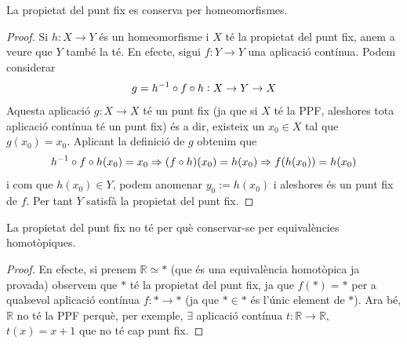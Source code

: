 \documentclass[../main.tex]{subfiles}
\begin{document}
\begin{prop}
[Exercici 11b]\label{exercici2.11.b} La propietat del punt fix es conserva per homeomorfismes.
\end{prop}
\begin{proof}
Si $h:X\rightarrow Y$ és un homeomorfisme i $X$ té la propietat del punt fix, anem a veure que $Y$ també la té. En efecte, sigui $f:Y\rightarrow Y$ una aplicació contínua. Podem considerar
\begin{equation}
    \notag
    g = h^{-1}\circ f\circ h:X\rightarrow Y\rightarrow X
\end{equation}
Aquesta aplicació $g:X\rightarrow X$ té un punt fix (ja que si $X$ té la PPF, aleshores tota aplicació contínua té un punt fix) és a dir, existeix un $x_0\in X$ tal que $g(x_0) = x_0$. Aplicant la definició de $g$ obtenim que
\begin{equation}
    \notag
    h^{-1}\circ f\circ h(x_0) = x_0 \Rightarrow (f\circ h)(x_0) = h(x_0) \Rightarrow f(h(x_0)) = h(x_0)
\end{equation}
i com que $h(x_0)\in Y$, podem anomenar $y_0:=h(x_0)$ i aleshores és un punt fix de $f$. Per tant $Y$ satisfà la propietat del punt fix.
\end{proof}

\begin{nota}
[Exercici 11b]\label{exercici2.11.b.2} La propietat del punt fix no té per què conservar-se per equivalències homotòpiques.
\end{nota}
\begin{proof}
En efecte, si prenem $\mathbb{R}\simeq *$ (que és una equivalència homotòpica ja provada) observem que $*$ té la propietat del punt fix, ja que $f(*) = *$ per a qualsevol aplicació contínua $f:*\rightarrow *$ (ja que $*\in *$ és l'únic element de $*$). Ara bé, $\mathbb{R}$ no té la PPF perquè, per exemple, $\exists$ aplicació contínua $t:\mathbb{R}\rightarrow \mathbb{R}$, $t(x) = x+1$ que no té cap punt fix.
\end{proof}
\end{document}
